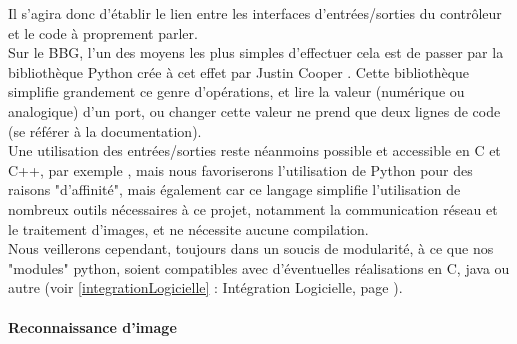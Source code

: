 			Il s'agira donc d'établir le lien entre les interfaces d'entrées/sorties du contrôleur et le code à proprement parler.\\

			Sur le BBG, l'un des moyens les plus simples d'effectuer cela est de passer par la bibliothèque Python crée à cet effet par Justin Cooper \cite{bib14} \cite{bib15}. Cette bibliothèque simplifie grandement ce genre d'opérations, et lire la valeur (numérique ou analogique) d'un port, ou changer cette valeur ne prend que deux lignes de code (se référer à la documentation).\\

			Une utilisation des entrées/sorties reste néanmoins possible et accessible en C et C++, par exemple \cite{bib16}, mais nous favoriserons l'utilisation de Python pour des raisons "d'affinité", mais également car ce langage simplifie l'utilisation de nombreux outils nécessaires à ce projet, notamment la communication réseau et le traitement d'images, et ne nécessite aucune compilation.\\

			Nous veillerons cependant, toujours dans un soucis de modularité, à ce que nos "modules" python, soient compatibles avec d'éventuelles réalisations en C, java ou autre (voir \ref{integrationLogicielle} : Intégration Logicielle, page \pageref{integrationLogicielle}).

		\paragraph{Reconnaissance d'image}\label{feuEtIntentions}
			

